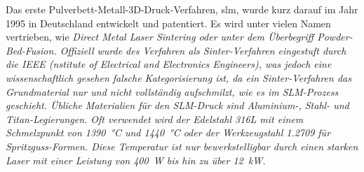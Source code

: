 \documentclass[../main.tex]{subfiles}
\begin{document}
Das erste Pulverbett-Metall-3D-Druck-Verfahren, \acrfull{slm}, wurde kurz darauf im Jahr 1995 in Deutschland entwickelt und patentiert. Es wird unter vielen Namen vertrieben, wie \it{Direct Metal Laser Sintering} oder unter dem Überbegriff \it{Powder-Bed-Fusion}. Offiziell wurde des Verfahren als Sinter-Verfahren eingestuft durch die IEEE (\it{nstitute of Electrical and Electronics Engineers}), was jedoch eine wissenschaftlich gesehen falsche Kategorisierung ist, da ein Sinter-Verfahren das Grundmaterial nur  und nicht vollständig aufschmilzt, wie es im SLM-Prozess geschieht. \parencite{SINTER_SMELT} Übliche Materialien für den SLM-Druck sind Aluminium-, Stahl- und Titan-Legierungen. Oft verwendet wird der Edelstahl 316L mit einem Schmelzpunkt von \qty{1390}{\celsius} und \qty{1440}{\degreeCelsius} \parencite{610LSTEEL} oder der Werkzeugstahl 1.2709 für Spritzguss-Formen. \parencite{steel12709} Diese Temperatur ist nur bewerkstelligbar durch einen starken Laser mit einer Leistung von \qty{400}{\watt} bis hin zu über \qty{12}{\kilo\watt}.
\end{document}
